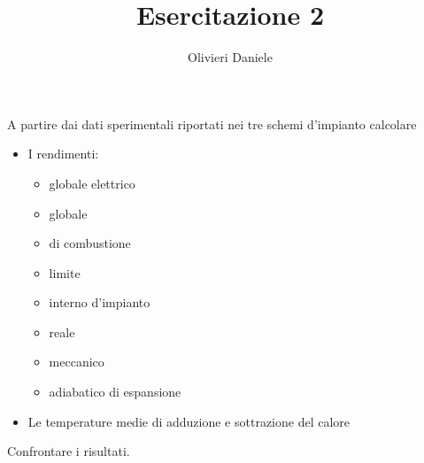 \documentclass[a4paper,12pt]{article}
\title{Esercitazione 2}
\author{Olivieri Daniele}
\date{}
\begin{document}
\maketitle
A partire dai dati sperimentali riportati nei tre schemi d'impianto calcolare
\begin{itemize}
    \item I rendimenti:
    \begin{itemize}
        \item globale elettrico
        \item globale
        \item di combustione
        \item limite
        \item interno d'impianto
        \item reale
        \item meccanico
        \item adiabatico di espansione
    \end{itemize}
    \item Le temperature medie di adduzione e sottrazione del calore
\end{itemize}
Confrontare i risultati.
\end{document}
